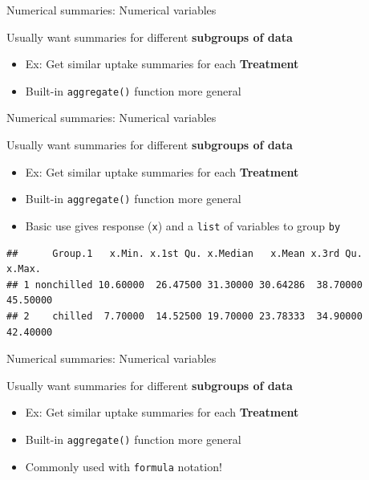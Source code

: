 \documentclass[
]{book}
\newenvironment{Shaded}{\begin{snugshade}}{\end{snugshade}}
\newcommand{\DataTypeTok}[1]{\textcolor[rgb]{0.13,0.29,0.53}{#1}}
\newcommand{\KeywordTok}[1]{\textcolor[rgb]{0.13,0.29,0.53}{\textbf{#1}}}
\newcommand{\NormalTok}[1]{#1}
\newcommand{\OperatorTok}[1]{\textcolor[rgb]{0.81,0.36,0.00}{\textbf{#1}}}
\theoremstyle{definition}
\theoremstyle{definition}
\theoremstyle{definition}
\theoremstyle{remark}
\begin{document}
Numerical summaries: Numerical variables

Usually want summaries for different \textbf{subgroups of data}

\begin{itemize}
\item
  Ex: Get similar uptake summaries for each \textbf{Treatment}
\item
  Built-in \texttt{aggregate()} function more general
\end{itemize}

Numerical summaries: Numerical variables

Usually want summaries for different \textbf{subgroups of data}

\begin{itemize}
\item
  Ex: Get similar uptake summaries for each \textbf{Treatment}
\item
  Built-in \texttt{aggregate()} function more general
\item
  Basic use gives response (\texttt{x}) and a \texttt{list} of variables to group \texttt{by}
\end{itemize}

\begin{Shaded}
\end{Shaded}

\begin{verbatim}
##      Group.1   x.Min. x.1st Qu. x.Median   x.Mean x.3rd Qu.   x.Max.
## 1 nonchilled 10.60000  26.47500 31.30000 30.64286  38.70000 45.50000
## 2    chilled  7.70000  14.52500 19.70000 23.78333  34.90000 42.40000
\end{verbatim}

Numerical summaries: Numerical variables

Usually want summaries for different \textbf{subgroups of data}

\begin{itemize}
\item
  Ex: Get similar uptake summaries for each \textbf{Treatment}
\item
  Built-in \texttt{aggregate()} function more general
\item
  Commonly used with \texttt{formula} notation!
\end{itemize}
\end{document}
